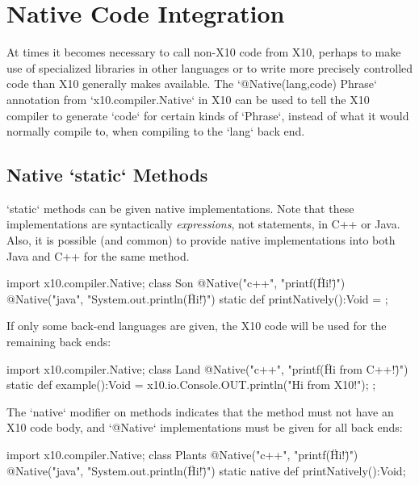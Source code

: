 \chapter{Native Code Integration}
\label{NativeCode}

At times it becomes necessary to call non-X10 code from X10, perhaps to make
use of specialized libraries in other languages or to write more precisely
controlled code than X10 generally makes available. The
\xcd`@Native(lang,code) Phrase` annotation from \xcd`x10.compiler.Native` in
X10 can be used to tell the X10 compiler to generate \xcd`code` for certain
kinds of \xcd`Phrase`, instead of what it would normally compile to, when
compiling to the \xcd`lang` back end.


\section{Native \xcd`static` Methods}

\xcd`static` methods can be given native implementations.  Note that these
implementations are syntactically {\em expressions}, not statements, in C++ or
Java.   Also, it is possible (and common) to provide native implementations
into both Java and C++ for the same method.
\begin{xten}
import x10.compiler.Native;
class Son {
  @Native("c++", "printf(\"Hi!\")")
  @Native("java", "System.out.println(\"Hi!\")")
  static def printNatively():Void = {};
}
\end{xten}
%

If only some back-end languages are given, the X10 code will be used for the
remaining back ends: 
\begin{xten}
import x10.compiler.Native;
class Land {
  @Native("c++", "printf(\"Hi from C++!\")")
  static def example():Void = {
    x10.io.Console.OUT.println("Hi from X10!");
  };
}
\end{xten}
%

The \xcd`native` modifier on methods indicates that the method must not have
an X10 code body, and \xcd`@Native` implementations must be given for all back
ends:
\begin{xten}
import x10.compiler.Native;
class Plants {
  @Native("c++", "printf(\"Hi!\")")
  @Native("java", "System.out.println(\"Hi!\")")
  static native def printNatively():Void;
}
\end{xten}
%


